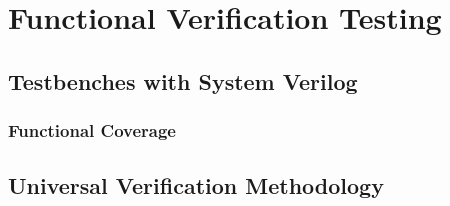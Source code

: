 \chapter{Functional Verification Testing}
\label{fvt}

\section{Testbenches with System Verilog}
\subsection{Functional Coverage}

\section{Universal Verification Methodology}